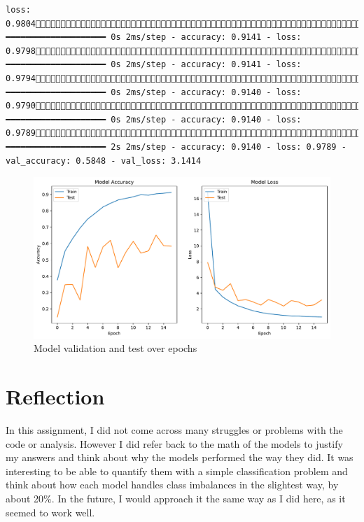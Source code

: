 \documentclass[
  letterpaper,
  DIV=11,
  numbers=noendperiod]{scrartcl}
\begin{document}
\begin{verbatim}
loss: 0.9804732/858 ━━━━━━━━━━━━━━━━━━━━ 0s 2ms/step - accuracy: 0.9141 - loss: 0.9798769/858 ━━━━━━━━━━━━━━━━━━━━ 0s 2ms/step - accuracy: 0.9141 - loss: 0.9794804/858 ━━━━━━━━━━━━━━━━━━━━ 0s 2ms/step - accuracy: 0.9140 - loss: 0.9790840/858 ━━━━━━━━━━━━━━━━━━━━ 0s 2ms/step - accuracy: 0.9140 - loss: 0.9789858/858 ━━━━━━━━━━━━━━━━━━━━ 2s 2ms/step - accuracy: 0.9140 - loss: 0.9789 - val_accuracy: 0.5848 - val_loss: 3.1414
\end{verbatim}

\begin{figure}

{\centering \includegraphics{HW2_Reflection_files/figure-pdf/model_output_dnn-output-2.pdf}

}

\caption{Model validation and test over epochs}

\end{figure}%

\section{Reflection}\label{reflection}

In this assignment, I did not come across many struggles or problems
with the code or analysis. However I did refer back to the math of the
models to justify my answers and think about why the models performed
the way they did. It was interesting to be able to quantify them with a
simple classification problem and think about how each model handles
class imbalances in the slightest way, by about 20\%. In the future, I
would approach it the same way as I did here, as it seemed to work well.
\end{document}
